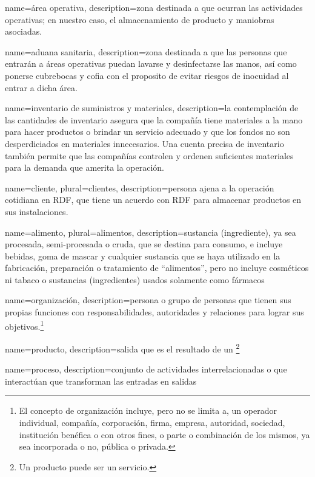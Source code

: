 {
    name=área operativa,
    description={zona destinada a que ocurran las actividades operativas; en nuestro caso, el almacenamiento de producto y maniobras asociadas.}
}

{
    name=aduana sanitaria,
    description={zona destinada a que las personas que entrarán a áreas operativas puedan lavarse y desinfectarse las manos, así como ponerse cubrebocas y cofia con el proposito de evitar riesgos de inocuidad al entrar a dicha área.}
}

{
    name=inventario de suministros y materiales,
    description=la contemplación de las cantidades de inventario asegura que la compañía tiene materiales a la mano para hacer productos o brindar un servicio adecuado y que los fondos no son desperdiciados en materiales innecesarios. Una cuenta precisa de inventario también permite que las compañías controlen y ordenen suficientes materiales para la demanda que amerita la operación.
}

{
    name=cliente,
    plural=clientes,
    description={persona ajena a la operación cotidiana en RDF, que tiene un acuerdo con RDF para almacenar productos en sus instalaciones.}
}

{
    name={alimento},
    plural={alimentos},
    description={sustancia (ingrediente), ya sea procesada, semi-procesada o cruda, que se destina para consumo, e incluye bebidas, goma de mascar y cualquier sustancia que se haya utilizado en la fabricación, preparación o tratamiento de “alimentos”, pero no incluye cosméticos ni tabaco o sustancias (ingredientes) usados solamente como fármacos}
}

{
    name=organización,
    description={persona o grupo de personas que tienen sus propias funciones con responsabilidades, autoridades y relaciones para lograr sus objetivos.\footnote{El concepto de organización incluye, pero no se limita a, un operador individual, compañía, corporación, firma, empresa, autoridad, sociedad, institución benéfica o con otros fines, o parte o combinación de los mismos, ya sea incorporada o no, pública o privada.}}
}

{
    name=producto,
    description={salida que es el resultado de un \footnote{Un producto puede ser un servicio.}}
}

{
    name=proceso,
    description={conjunto de actividades interrelacionadas o que interactúan que transforman las entradas en salidas}
}

